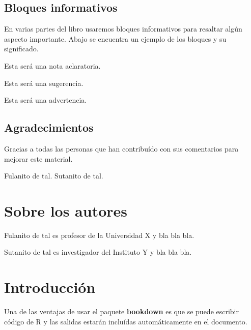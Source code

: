 \documentclass[
]{krantz}
\makeatletter
\newenvironment{rmdblock}[1]
  {
  \begin{itemize}
  \renewcommand{\labelitemi}{
    \raisebox{-.7\height}[0pt][0pt]{
      {\setkeys{Gin}{width=3em,keepaspectratio}\texttt{[image: images/\#1]}}
    }
  }
  \setlength{\fboxsep}{1em}
  \begin{kframe}
  \item
  }
  {
  \end{kframe}
  \end{itemize}
  }
\newenvironment{rmdnote}
  {\begin{rmdblock}{note}}
  {\end{rmdblock}}
\newenvironment{rmdtip}
  {\begin{rmdblock}{tip}}
  {\end{rmdblock}}
\newenvironment{rmdwarning}
  {\begin{rmdblock}{warning}}
  {\end{rmdblock}}
\newenvironment{kframe}{%
\medskip{}
\setlength{\fboxsep}{.8em}
 \def\at@end@of@kframe{}%
 \ifinner\ifhmode%
  \def\at@end@of@kframe{\end{minipage}}%
  \begin{minipage}{\columnwidth}%
 \fi\fi%
 \def\FrameCommand##1{\hskip\@totalleftmargin \hskip-\fboxsep
 \colorbox{shadecolor}{##1}\hskip-\fboxsep
     \hskip-\linewidth \hskip-\@totalleftmargin \hskip\columnwidth}%
 \MakeFramed {\advance\hsize-\width
   \@totalleftmargin\z@ \linewidth\hsize
   \@setminipage}}%
 {\par\unskip\endMakeFramed%
 \at@end@of@kframe}
\makeatother
\begin{document}
\hypertarget{bloques-informativos}{%
\section*{Bloques informativos}\label{bloques-informativos}}


En varias partes del libro usaremos bloques informativos para resaltar algún aspecto importante. Abajo se encuentra un ejemplo de los bloques y su significado.

\begin{rmdnote}
Esta será una nota aclaratoria.
\end{rmdnote}

\begin{rmdtip}
Esta será una sugerencia.
\end{rmdtip}

\begin{rmdwarning}
Esta será una advertencia.
\end{rmdwarning}

\hypertarget{agradecimientos}{%
\section*{Agradecimientos}\label{agradecimientos}}


Gracias a todas las personas que han contribuído con sus comentarios para mejorar este material.

\begin{flushright}
Fulanito de tal.
Sutanito de tal.
\end{flushright}

\hypertarget{sobre-los-autores}{%
\chapter*{Sobre los autores}\label{sobre-los-autores}}


Fulanito de tal es profesor de la Universidad X y bla bla bla.

Sutanito de tal es investigador del Instituto Y y bla bla bla.

\mainmatter

\hypertarget{intro}{%
\chapter{Introducción}\label{intro}}

Una de las ventajas de usar el paquete \textbf{bookdown} \citep{R-bookdown} es que se puede escribir código de R y las salidas estarán incluídas automáticamente en el documento.
\end{document}
